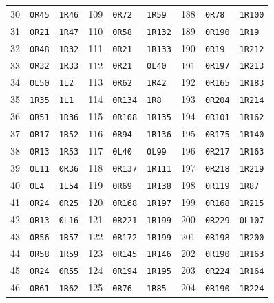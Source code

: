 \begin{longtable}{rll@{\qquad}rll@{\qquad}rll}
30 & \texttt{0R45} & \texttt{1R46} & 109 & \texttt{0R72} & \texttt{1R59} & 188 & \texttt{0R78} & \texttt{1R100}\\
31 & \texttt{0R21} & \texttt{1R47} & 110 & \texttt{0R58} & \texttt{1R132} & 189 & \texttt{0R190} & \texttt{1R19}\\
32 & \texttt{0R48} & \texttt{1R32} & 111 & \texttt{0R21} & \texttt{1R133} & 190 & \texttt{0R19} & \texttt{1R212}\\
33 & \texttt{0R32} & \texttt{1R33} & 112 & \texttt{0R21} & \texttt{0L40} & 191 & \texttt{0R197} & \texttt{1R213}\\
34 & \texttt{0L50} & \texttt{1L2} & 113 & \texttt{0R62} & \texttt{1R42} & 192 & \texttt{0R165} & \texttt{1R183}\\
35 & \texttt{1R35} & \texttt{1L1} & 114 & \texttt{0R134} & \texttt{1R8} & 193 & \texttt{0R204} & \texttt{1R214}\\
36 & \texttt{0R51} & \texttt{1R36} & 115 & \texttt{0R108} & \texttt{1R135} & 194 & \texttt{0R101} & \texttt{1R162}\\
37 & \texttt{0R17} & \texttt{1R52} & 116 & \texttt{0R94} & \texttt{1R136} & 195 & \texttt{0R175} & \texttt{1R140}\\
38 & \texttt{0R13} & \texttt{1R53} & 117 & \texttt{0L40} & \texttt{0L99} & 196 & \texttt{0R217} & \texttt{1R163}\\
39 & \texttt{0L11} & \texttt{0R36} & 118 & \texttt{0R137} & \texttt{1R111} & 197 & \texttt{0R218} & \texttt{1R219}\\
40 & \texttt{0L4} & \texttt{1L54} & 119 & \texttt{0R69} & \texttt{1R138} & 198 & \texttt{0R119} & \texttt{1R87}\\
41 & \texttt{0R24} & \texttt{0R25} & 120 & \texttt{0R168} & \texttt{1R197} & 199 & \texttt{0R168} & \texttt{1R215}\\
42 & \texttt{0R13} & \texttt{0L16} & 121 & \texttt{0R221} & \texttt{1R199} & 200 & \texttt{0R229} & \texttt{0L107}\\
43 & \texttt{0R56} & \texttt{1R57} & 122 & \texttt{0R172} & \texttt{1R199} & 201 & \texttt{0R198} & \texttt{1R200}\\
44 & \texttt{0R58} & \texttt{1R59} & 123 & \texttt{0R145} & \texttt{1R146} & 202 & \texttt{0R190} & \texttt{1R163}\\
45 & \texttt{0R24} & \texttt{0R55} & 124 & \texttt{0R194} & \texttt{1R195} & 203 & \texttt{0R224} & \texttt{1R164}\\
46 & \texttt{0R61} & \texttt{1R62} & 125 & \texttt{0R76} & \texttt{1R85} & 204 & \texttt{0R190} & \texttt{1R224}\\

\end{longtable}
